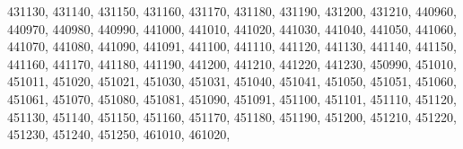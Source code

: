 \textquotesingle{}431130\textquotesingle{}, \textquotesingle{}431140\textquotesingle{}, \textquotesingle{}431150\textquotesingle{}, \textquotesingle{}431160\textquotesingle{}, \textquotesingle{}431170\textquotesingle{}, \textquotesingle{}431180\textquotesingle{}, \textquotesingle{}431190\textquotesingle{}, \textquotesingle{}431200\textquotesingle{}, \textquotesingle{}431210\textquotesingle{}, \textquotesingle{}440960\textquotesingle{}, \textquotesingle{}440970\textquotesingle{}, \textquotesingle{}440980\textquotesingle{}, \textquotesingle{}440990\textquotesingle{}, \textquotesingle{}441000\textquotesingle{}, \textquotesingle{}441010\textquotesingle{}, \textquotesingle{}441020\textquotesingle{}, \textquotesingle{}441030\textquotesingle{}, \textquotesingle{}441040\textquotesingle{}, \textquotesingle{}441050\textquotesingle{}, \textquotesingle{}441060\textquotesingle{}, \textquotesingle{}441070\textquotesingle{}, \textquotesingle{}441080\textquotesingle{}, \textquotesingle{}441090\textquotesingle{}, \textquotesingle{}441091\textquotesingle{}, \textquotesingle{}441100\textquotesingle{}, \textquotesingle{}441110\textquotesingle{}, \textquotesingle{}441120\textquotesingle{}, \textquotesingle{}441130\textquotesingle{}, \textquotesingle{}441140\textquotesingle{}, \textquotesingle{}441150\textquotesingle{}, \textquotesingle{}441160\textquotesingle{}, \textquotesingle{}441170\textquotesingle{}, \textquotesingle{}441180\textquotesingle{}, \textquotesingle{}441190\textquotesingle{}, \textquotesingle{}441200\textquotesingle{}, \textquotesingle{}441210\textquotesingle{}, \textquotesingle{}441220\textquotesingle{}, \textquotesingle{}441230\textquotesingle{}, \textquotesingle{}450990\textquotesingle{}, \textquotesingle{}451010\textquotesingle{}, \textquotesingle{}451011\textquotesingle{}, \textquotesingle{}451020\textquotesingle{}, \textquotesingle{}451021\textquotesingle{}, \textquotesingle{}451030\textquotesingle{}, \textquotesingle{}451031\textquotesingle{}, \textquotesingle{}451040\textquotesingle{}, \textquotesingle{}451041\textquotesingle{}, \textquotesingle{}451050\textquotesingle{}, \textquotesingle{}451051\textquotesingle{}, \textquotesingle{}451060\textquotesingle{}, \textquotesingle{}451061\textquotesingle{}, \textquotesingle{}451070\textquotesingle{}, \textquotesingle{}451080\textquotesingle{}, \textquotesingle{}451081\textquotesingle{}, \textquotesingle{}451090\textquotesingle{}, \textquotesingle{}451091\textquotesingle{}, \textquotesingle{}451100\textquotesingle{}, \textquotesingle{}451101\textquotesingle{}, \textquotesingle{}451110\textquotesingle{}, \textquotesingle{}451120\textquotesingle{}, \textquotesingle{}451130\textquotesingle{}, \textquotesingle{}451140\textquotesingle{}, \textquotesingle{}451150\textquotesingle{}, \textquotesingle{}451160\textquotesingle{}, \textquotesingle{}451170\textquotesingle{}, \textquotesingle{}451180\textquotesingle{}, \textquotesingle{}451190\textquotesingle{}, \textquotesingle{}451200\textquotesingle{}, \textquotesingle{}451210\textquotesingle{}, \textquotesingle{}451220\textquotesingle{}, \textquotesingle{}451230\textquotesingle{}, \textquotesingle{}451240\textquotesingle{}, \textquotesingle{}451250\textquotesingle{}, \textquotesingle{}461010\textquotesingle{}, \textquotesingle{}461020\textquotesingle{}, 